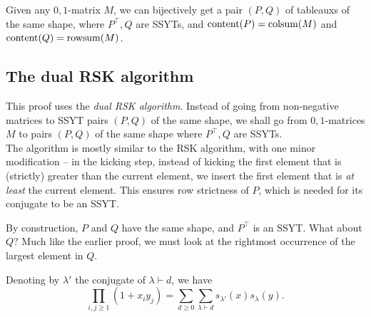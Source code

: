 	\begin{ftheo}
		Given any $0,1$-matrix $M$, we can bijectively get a pair $(P,Q)$ of tableauxs of the same shape, where $P^\top, Q$ are SSYTs, and $\operatorname{content}(P) = \operatorname{colsum}(M)$ and $\operatorname{content}(Q) = \operatorname{rowsum}(M)$.  
	\end{ftheo}

\subsection{The dual RSK algorithm}

	This proof uses the \emph{dual RSK algorithm}. Instead of going from non-negative matrices to SSYT pairs $(P,Q)$ of the same shape, we shall go from $0,1$-matrices $M$ to pairs $(P,Q)$ of the same shape where $P^\top,Q$ are SSYTs.\\
	The algorithm is mostly similar to the RSK algorithm, with one minor modification -- in the kicking step, instead of kicking the first element that is (strictly) greater than the current element, we insert the first element that is \emph{at least} the current element. This ensures row strictness of $P$, which is needed for its conjugate to be an SSYT.









	By construction, $P$ and $Q$ have the same shape, and $P^\top$ is an SSYT. What about $Q$? Much like the earlier proof, we must look at the rightmost occurrence of the largest element in $Q$.


	\begin{fcor}
		Denoting by $\lambda'$ the conjugate of $\lambda \vdash d$, we have
		\[ \prod_{i,j \ge 1} (1+x_iy_j) = \sum_{d \ge 0} \sum_{\lambda \vdash d} s_{\lambda'}(x) s_\lambda(y). \]
	\end{fcor}

